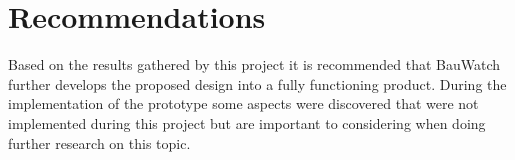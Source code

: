 %
%
%
%




\chapter{Recommendations}
\label{sec:recommendations}
Based on the results gathered by this project it is recommended that BauWatch further develops the proposed design into a fully functioning product.
During the implementation of the prototype some aspects were discovered that were not implemented during this project but are important to considering when doing further research on this topic.


